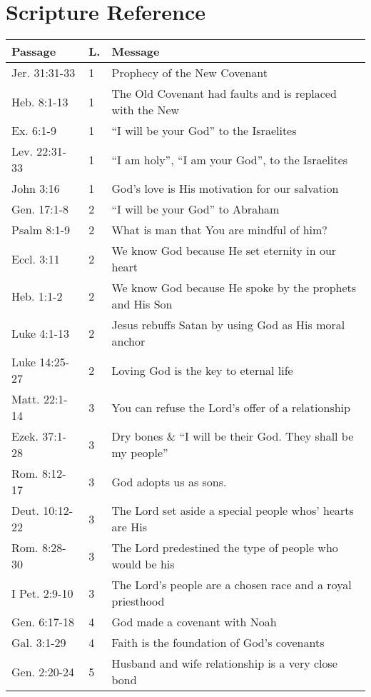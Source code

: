 \chapter{Scripture Reference}

\begin{table}[h]%
\centering
\begin{tabular}{llp{11cm}}
\toprule
Passage & L. & Message \\
\midrule
Jer. 31:31-33  & 1 & Prophecy of the New Covenant\\
Heb. 8:1-13    & 1 & The Old Covenant had faults and is replaced with the New\\
Ex. 6:1-9       & 1 & ``I will be your God'' to the Israelites\\
Lev. 22:31-33   & 1 & ``I am holy'', ``I am your God'', to the Israelites\\
John 3:16       & 1 & God's love is His motivation for our salvation\\
Gen. 17:1-8     & 2 & ``I will be your God'' to Abraham\\
Psalm 8:1-9     & 2 & What is man that You are mindful of him?\\
Eccl. 3:11      & 2 & We know God because He set eternity in our heart\\
Heb. 1:1-2      & 2 & We know God because He spoke by the prophets and His Son\\
Luke 4:1-13     & 2 & Jesus rebuffs Satan by using God as His moral anchor\\
Luke 14:25-27   & 2 & Loving God is the key to eternal life\\
Matt. 22:1-14   & 3 & You can refuse the Lord's offer of a relationship\\
Ezek. 37:1-28   & 3 & Dry bones \& ``I will be their God.  They shall be my people''\\
Rom. 8:12-17    & 3 & God adopts us as sons.\\
Deut. 10:12-22  & 3 & The Lord set aside a special people whos' hearts are His\\
Rom. 8:28-30    & 3 & The Lord predestined the type of people who would be his\\
I Pet. 2:9-10   & 3 & The Lord's people are a chosen race and a royal priesthood\\
Gen. 6:17-18    & 4 & God made a covenant with Noah \\
Gal. 3:1-29     & 4 & Faith is the foundation of God's covenants\\
Gen. 2:20-24    & 5 & Husband and wife relationship is a very close bond\\

\end{tabular}
\end{table}
